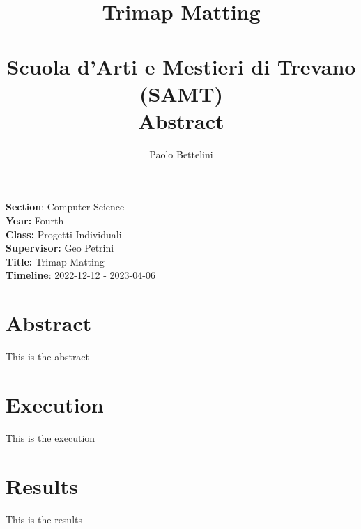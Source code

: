 \documentclass[a4paper]{article}
\title{%
    Trimap Matting \\
    \phantom{} \\
    \large Scuola d'Arti e Mestieri di Trevano (SAMT) \\
    \large Abstract
}
\author{Paolo Bettelini}
\date{}
\begin{document}
\maketitle

\vspace{2cm}

\textbf{Section}: Computer Science \\
\textbf{Year:} Fourth \\
\textbf{Class:} Progetti Individuali \\
\textbf{Supervisor:} Geo Petrini \\
\textbf{Title:} Trimap Matting \\
\textbf{Timeline}: 2022-12-12 - 2023-04-06

\vspace{2cm}

\thispagestyle{empty} %

\section*{Abstract}

This is the abstract

\section*{Execution}

This is the execution

\section*{Results}

This is the results
\end{document}
